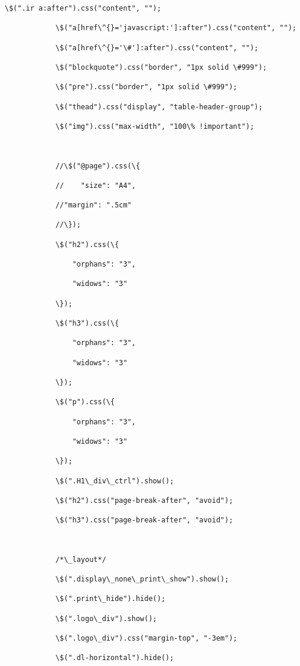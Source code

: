 \documentclass[11pt]{article}
\begin{document}
\begin{Verbatim}[commandchars=\\\{\}]
            \$(".ir a:after").css("content", "");

            \$("a[href\^{}='javascript:']:after").css("content", "");

            \$("a[href\^{}='\#']:after").css("content", "");

            \$("blockquote").css("border", "1px solid \#999");

            \$("pre").css("border", "1px solid \#999");

            \$("thead").css("display", "table-header-group");

            \$("img").css("max-width", "100\% !important");



            //\$("@page").css(\{

            //    "size": "A4",

            //"margin": ".5cm"

            //\});

            \$("h2").css(\{

                "orphans": "3",

                "widows": "3"

            \});

            \$("h3").css(\{

                "orphans": "3",

                "widows": "3"

            \});

            \$("p").css(\{

                "orphans": "3",

                "widows": "3"

            \});

            \$(".H1\_div\_ctrl").show();

            \$("h2").css("page-break-after", "avoid");

            \$("h3").css("page-break-after", "avoid");



            /*\_layout*/

            \$(".display\_none\_print\_show").show();

            \$(".print\_hide").hide();

            \$(".logo\_div").show();

            \$(".logo\_div").css("margin-top", "-3em");

            \$(".dl-horizontal").hide();


\end{Verbatim}
\end{document}
